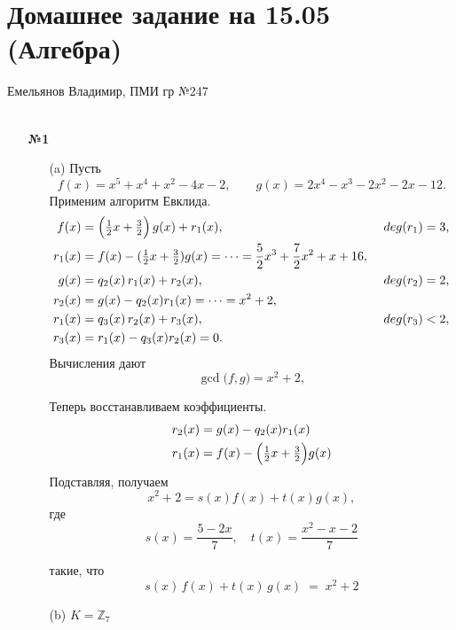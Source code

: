 \documentclass[a4paper]{article}
\begin{document}
\section*{Домашнее задание на 15.05 (Алгебра)}
{\large Емельянов Владимир, ПМИ гр №247}\\\\
\begin{enumerate}
  \item[\textbf{№1}]\begin{enumerate}
    \item[(a)]Пусть
    \[
    f(x)=x^5+x^4+x^2-4x-2,\qquad
    g(x)=2x^4 - x^3 -2x^2 -2x -12.
    \]
    Применим алгоритм Евклида.
    \begin{align*}
    f(x) &= \Bigl(\tfrac12 x + \tfrac32\Bigr)\,g(x) + r_1(x), &\ deg(r_1)=3,\\
    r_1(x) &= f(x) - (\tfrac12 x + \tfrac32)g(x) = \dots = \frac{5}{2}x^3 + \frac{7}{2}x^2 + x + 16,\\
    g(x) &= q_2(x)\,r_1(x) + r_2(x), &\ deg(r_2)=2,\\
    r_2(x) &= g(x) - q_2(x)r_1(x) = \dots = x^2 + 2,\\
    r_1(x) &= q_3(x)\,r_2(x) + r_3(x), &\ deg(r_3)<2,\\
    r_3(x) &= r_1(x) - q_3(x)r_2(x) = 0.
    \end{align*}
    Вычисления дают
    \[
    \gcd\bigl(f,g\bigr)=x^2+2,
    \]

    Теперь восстанавливаем коэффициенты.
    \begin{align*}
    r_2(x) &= g(x) - q_2(x)r_1(x)\\
    r_1(x) &= f(x) - \Bigl(\tfrac12 x + \tfrac32\Bigr)g(x)
    \end{align*}
    Подставляя, получаем
    \[
    x^2+2 = s(x)f(x) + t(x)g(x),
    \]
    где
    \[
    s(x)=\frac{5-2x}{7},\quad t(x)=\frac{x^2 - x -2}{7}
    \]

    такие, что
    \[
    s(x)\,f(x) + t(x)\,g(x) \;=\; x^2+2
    \]

    \item[(b)]$K=\mathbb{Z}_7$
    

\end{enumerate}
\end{enumerate}
\end{document}
